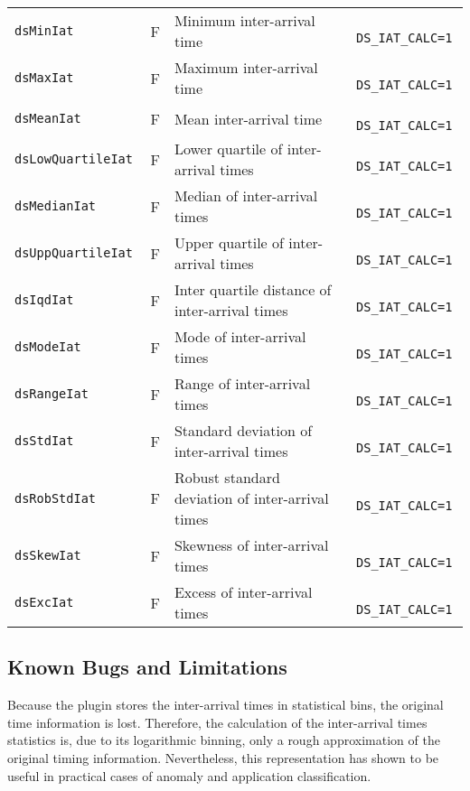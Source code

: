 \documentclass[documentation]{subfiles}
\begin{document}
\begin{longtable}{>{\tt}lll>{\tt\small}l}
    dsMinIat         & F & Minimum inter-arrival time                       & DS\_IAT\_CALC=1\\
    dsMaxIat         & F & Maximum inter-arrival time                       & DS\_IAT\_CALC=1\\
    dsMeanIat        & F & Mean inter-arrival time                          & DS\_IAT\_CALC=1\\
    dsLowQuartileIat & F & Lower quartile of inter-arrival times            & DS\_IAT\_CALC=1\\
    dsMedianIat      & F & Median of inter-arrival times                    & DS\_IAT\_CALC=1\\
    dsUppQuartileIat & F & Upper quartile of inter-arrival times            & DS\_IAT\_CALC=1\\
    dsIqdIat         & F & Inter quartile distance of inter-arrival times   & DS\_IAT\_CALC=1\\
    dsModeIat        & F & Mode of inter-arrival times                      & DS\_IAT\_CALC=1\\
    dsRangeIat       & F & Range of inter-arrival times                     & DS\_IAT\_CALC=1\\
    dsStdIat         & F & Standard deviation of inter-arrival times        & DS\_IAT\_CALC=1\\
    dsRobStdIat      & F & Robust standard deviation of inter-arrival times & DS\_IAT\_CALC=1\\
    dsSkewIat        & F & Skewness of inter-arrival times                  & DS\_IAT\_CALC=1\\
    dsExcIat         & F & Excess of inter-arrival times                    & DS\_IAT\_CALC=1\\
    \bottomrule
\end{longtable}

\subsection{Known Bugs and Limitations}
Because the  plugin stores the inter-arrival times in statistical bins, the original time information is lost.
Therefore, the calculation of the inter-arrival times statistics is, due to its logarithmic binning, only a rough approximation of the original timing information.
Nevertheless, this representation has shown to be useful in practical cases of anomaly and application classification.
\end{document}
